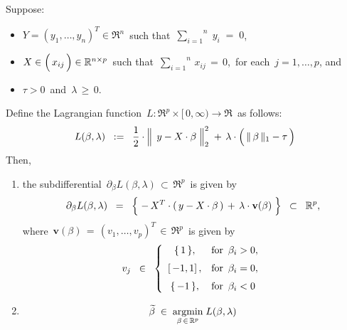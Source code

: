 \vskip 0.5cm
\begin{lemma}
\mbox{}
\vskip 0.1cm
\noindent
Suppose:
\begin{itemize}
\item
	$Y = (y_{1},\ldots,y_{n})^{T} \in \Re^{n}$\,
	such that
	\,$\overset{n}{\underset{i=1}{\sum}}\;y_{i} \; = \; 0$,\,
\item
	$X \in \left(\,\overset{{\color{white}-}}{x_{ij}}\,\right)\in\Re^{n \times p}$\,
	such that
	\,$\overset{n}{\underset{i=1}{\sum}}\, x_{ij} \, = \, 0$,\,
	for each \,$j = 1,\ldots,p$, and
\item
	$\tau > 0$\, and \,$\lambda \,\geq\, 0$.
\end{itemize}
Define the Lagrangian function
\,$L : \Re^{p} \times [\,0,\infty) \longrightarrow \Re$\,
as follows:
\begin{equation*}
L(\beta,\lambda)
\;\; := \;\;
	\dfrac{1}{2}
	\cdot
	\left\Vert\;\, y \overset{{\color{white}.}}{-} X\cdot\beta \;\right\Vert_{2}^{2}
	\; + \,
	\lambda\cdot\left(\,\Vert\,\beta\,\Vert_{1} \overset{{\color{white}.}}{-} \tau\,\right)
\end{equation*}
Then,
\begin{enumerate}
\item
	the subdifferential
	\,$\partial_{\beta} L(\beta,\lambda) \,\subset\, \Re^{p}$\,
	is given by
	\begin{equation*}
		\partial_{\beta} L(\beta,\lambda)
	\;\; = \;\;
		\left\{\;
			- \, X^{T} \cdot (\,y - X \cdot \beta\,)
			\, \overset{{\color{white}.}}{+} \,
			\lambda\cdot\mathbf{v}(\beta)
			\;\right\}
	\;\; \subset \;\;
		\Re^{p},
	\end{equation*}
	where \,$\mathbf{v}(\beta) \,=\, (v_{1},\ldots,v_{p})^{T} \,\in\, \Re^{p}$\, is given by
	\begin{equation*}
	v_{j}
	\;\; \in \;\;
		\left\{\begin{array}{cl}
			\{\,1\,\}, & \textnormal{for \,$\beta_{i} > 0$},
			\\
			\left[\,-1,1\right], & \overset{{\color{white}1}}{\textnormal{for \,$\beta_{i} = 0$}},
			\\
			\{\,-1\,\}, & \overset{{\color{white}1}}{\textnormal{for \,$\beta_{i} < 0$}}
			\end{array}\right.
	\end{equation*}
\item
	\begin{equation*}
	\widetilde{\beta}
	\; \in \;
		\underset{\beta\,\in\,\Re^{p}}{\argmin}\;L(\beta,\lambda)

\end{equation*}
\end{enumerate}
\end{lemma}
